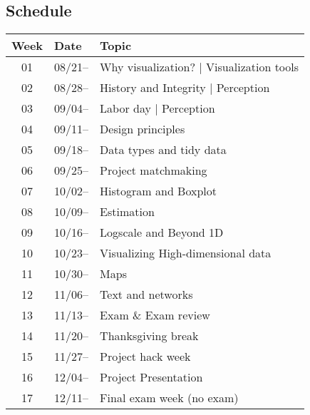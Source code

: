 \subsection{Schedule}\label{sub:schedule}%

\begin{tabular}{@{}cll@{}} \toprule
  Week & Date & Topic \\\midrule
  01 & 08/21-- & Why visualization? | Visualization tools \\
  02 & 08/28-- & History and Integrity | Perception \\
  03 & 09/04--  & Labor day | Perception \\
  04 & 09/11--  & Design principles \\
  05 & 09/18--  & Data types and tidy data \\
  06 & 09/25--  & Project matchmaking \\
  07 & 10/02--  &  Histogram and Boxplot  \\
  08 & 10/09--  & Estimation \\
  09 & 10/16--  &  Logscale and Beyond 1D \\
  10 & 10/23--  & Visualizing High-dimensional data \\
  11 & 10/30--  & Maps \\
  12 & 11/06--  & Text and networks \\
  13 & 11/13--  & Exam \& Exam review\\
  14 & 11/20--  & Thanksgiving break \\
  15 & 11/27--  & Project hack week \\
  16 & 12/04--  & Project Presentation \\
  17 & 12/11--  & Final exam week (no exam) \\
  \bottomrule
\end{tabular}

